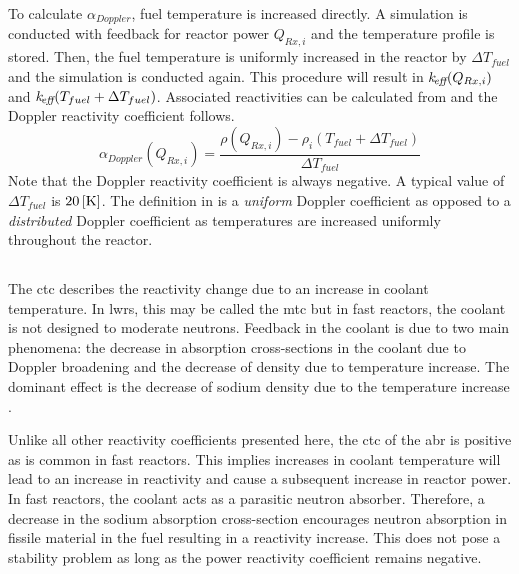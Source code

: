     To calculate $\alpha_{Doppler}$, fuel temperature is increased directly. A
    simulation is conducted with feedback for reactor power $Q_{Rx,i}$ and the
    temperature profile is stored. Then, the fuel temperature is uniformly 
    increased in the reactor by $\Delta T_{fuel}$ and the simulation is
    conducted again. This procedure will result in $k_{\!\mbox{\scriptsize \em eff}}(Q_{Rx,i})$ and
    ${k_{\!\mbox{\scriptsize \em eff}}(T_{fuel} + \Delta T_{fuel})}$. Associated reactivities can be
    calculated from  and the Doppler reactivity coefficient
    follows.
    \begin{equation}
      \label{eq:doppler_reactivity_coefficient}
      \alpha_{Doppler}(Q_{Rx,i}) = \frac{\rho(Q_{Rx,i}) - \rho_i(T_{fuel} +
        \Delta T_{fuel})} {\Delta T_{fuel}}
    \end{equation}
    Note that the Doppler reactivity coefficient is always negative.
    A typical value of $\Delta T_{fuel}$ is $20\left[\text{{K}}\right]$.
    The definition in  is a
    \textit{uniform} Doppler coefficient as opposed to a \textit{distributed} 
    Doppler coefficient as temperatures are increased uniformly throughout the
    reactor.

  \subsection{\texorpdfstring{}{Coolant Temperature
    Coefficient (CTC)}}
  \label{sec:coolant_temperature_reactivity_coefficient}
    The \gls{ctc} describes the
    reactivity change due to an increase in coolant temperature. In \glspl{lwr}, 
    this may be called the \gls{mtc} but in fast
    reactors, the coolant is not designed to moderate neutrons. Feedback in the 
    coolant is due to two main phenomena: the decrease in absorption 
    cross-sections in the coolant due to Doppler broadening and the decrease of 
    density due to temperature increase. The dominant effect is the decrease of 
    sodium density due to the temperature increase \cite{textbookknief}.

    Unlike all other reactivity coefficients presented here, the \gls{ctc} of the 
    \gls{abr} is positive as is common in fast reactors. This implies increases 
    in coolant temperature will lead to an increase in reactivity and cause a 
    subsequent increase in reactor power. In fast reactors, the coolant acts as 
    a parasitic neutron absorber. Therefore, a decrease in the sodium absorption 
    cross-section encourages neutron absorption in fissile material in the fuel 
    resulting in a reactivity increase. This does not pose a stability problem 
    as long as the power reactivity coefficient remains negative.

